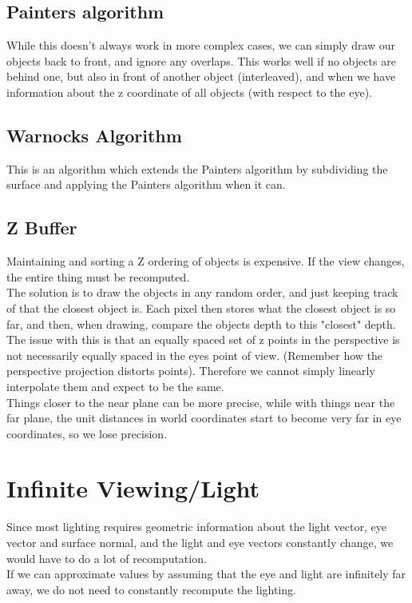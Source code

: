 \documentclass[12pt]{article}
\theoremstyle{definition}
\begin{document}
\subsection{Painters algorithm}
While this doesn't always work in more complex cases, we can simply draw our objects back to front, and ignore any overlaps. This works well if no objects are behind one, but also in front of another object (interleaved), and when we have information about the z coordinate of all objects (with respect to the eye).
\subsection{Warnocks Algorithm}
This is an algorithm which extends the Painters algorithm by subdividing the surface and applying the Painters algorithm when it can.
\subsection{Z Buffer}
Maintaining and sorting a Z ordering of objects is expensive. If the view changes, the entire thing must be recomputed. 
\\ \linebreak
The solution is to draw the objects in any random order, and just keeping track of that the closest object is. Each pixel then stores what the closest object is so far, and then, when drawing, compare the objects depth to this "closest" depth.
\\ \linebreak
The issue with this is that an equally spaced set of z points in the perspective is not necessarily equally spaced in the eyes point of view. (Remember how the perspective projection distorts points). Therefore we cannot simply linearly interpolate them and expect to be the same. 
\\ \linebreak
Things closer to the near plane can be more precise, while with things near the far plane, the unit distances in world coordinates start to become very far in eye coordinates, so we lose precision.

\section{Infinite Viewing/Light}
Since most lighting requires geometric information about the light vector, eye vector and surface normal, and the light and eye vectors constantly change, we would have to do a lot of recomputation.
\\ \linebreak
If we can approximate values by assuming that the eye and light are infinitely far away, we do not need to constantly recompute the lighting.
\\ \linebreak
\end{document}
